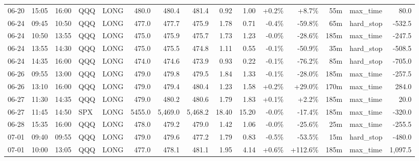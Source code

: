 \documentclass[11pt,a4paper,twoside]{article}
\begin{document}
\begin{landscape}
\begin{center}
\begin{longtable}{>{\color{txtmain}}l l l l l r r r r r r r r >{\color{txtmain}}l r}
06-20 & 15:05 & 16:00 & QQQ & LONG & 480.0 & 480.4 & 481.4 & 0.92 & 1.00 & \textcolor{wingreen}{+0.2\%} & \textcolor{wingreen}{+8.7\%} & 55m & max\_time & \textcolor{wingreen}{80.0} \\
06-24 & 09:45 & 10:50 & QQQ & LONG & 477.0 & 477.7 & 475.9 & 1.78 & 0.71 & \textcolor{lossred}{-0.4\%} & \textcolor{lossred}{-59.8\%} & 65m & hard\_stop & \textcolor{lossred}{-532.5} \\
06-24 & 10:50 & 13:55 & QQQ & LONG & 475.0 & 475.9 & 475.7 & 1.73 & 1.23 & \textcolor{lossred}{-0.0\%} & \textcolor{lossred}{-28.6\%} & 185m & max\_time & \textcolor{lossred}{-247.5} \\
06-24 & 13:55 & 14:30 & QQQ & LONG & 475.0 & 475.5 & 474.8 & 1.11 & 0.55 & \textcolor{lossred}{-0.1\%} & \textcolor{lossred}{-50.9\%} & 35m & hard\_stop & \textcolor{lossred}{-508.5} \\
06-24 & 14:35 & 16:00 & QQQ & LONG & 474.0 & 474.6 & 473.9 & 0.93 & 0.22 & \textcolor{lossred}{-0.1\%} & \textcolor{lossred}{-76.2\%} & 85m & hard\_stop & \textcolor{lossred}{-705.0} \\
06-26 & 09:55 & 13:00 & QQQ & LONG & 479.0 & 479.8 & 479.5 & 1.84 & 1.33 & \textcolor{lossred}{-0.1\%} & \textcolor{lossred}{-28.0\%} & 185m & max\_time & \textcolor{lossred}{-257.5} \\
06-26 & 13:10 & 16:00 & QQQ & LONG & 479.0 & 479.4 & 480.4 & 1.23 & 1.58 & \textcolor{wingreen}{+0.2\%} & \textcolor{wingreen}{+29.0\%} & 170m & max\_time & \textcolor{wingreen}{284.0} \\
06-27 & 11:30 & 14:35 & QQQ & LONG & 479.0 & 480.2 & 480.6 & 1.79 & 1.83 & \textcolor{wingreen}{+0.1\%} & \textcolor{wingreen}{+2.2\%} & 185m & max\_time & \textcolor{wingreen}{20.0} \\
06-27 & 11:45 & 14:50 & SPX & LONG & 5455.0 & 5,469.0 & 5,468.2 & 18.40 & 15.20 & \textcolor{lossred}{-0.0\%} & \textcolor{lossred}{-17.4\%} & 185m & max\_time & \textcolor{lossred}{-320.0} \\
06-28 & 15:35 & 16:00 & QQQ & LONG & 478.0 & 479.2 & 479.0 & 1.42 & 1.06 & \textcolor{lossred}{-0.0\%} & \textcolor{lossred}{-25.6\%} & 25m & max\_time & \textcolor{lossred}{-255.5} \\
07-01 & 09:40 & 09:55 & QQQ & LONG & 479.0 & 479.6 & 477.2 & 1.79 & 0.83 & \textcolor{lossred}{-0.5\%} & \textcolor{lossred}{-53.5\%} & 15m & hard\_stop & \textcolor{lossred}{-480.0} \\
07-01 & 10:00 & 13:05 & QQQ & LONG & 477.0 & 478.1 & 481.1 & 1.95 & 4.14 & \textcolor{wingreen}{+0.6\%} & \textcolor{wingreen}{+112.6\%} & 185m & max\_time & \textcolor{wingreen}{1,097.5} \\

\end{longtable}
\end{center}
\end{landscape}
\end{document}

